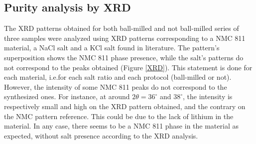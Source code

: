 \documentclass{article}
\begin{document}
\subsection{Purity analysis by XRD}
The XRD patterns obtained for both ball-milled and not ball-milled series of three samples were 
analyzed using XRD patterns corresponding to a NMC 811 material, a NaCl salt and a KCl salt found in
 literature. The pattern's superposition shows the NMC 811 phase presence, while the salt's patterns
 do not correspond to the peaks obtained (Figure \ref{XRD}). This statement is done for each material, i.e.for
 each salt ratio and each protocol (ball-milled or not). However, the intensity of some NMC 811 peaks do 
not correspond to the synthesized ones. For instance, at around \(2\theta=36^\circ\) and \(38^\circ\), the intensity is respectively
 small and high on the XRD pattern obtained, and the contrary on the NMC pattern reference. This could be due
 to the lack of lithium in the material. In any case, there seems to be a NMC
 811 phase in the material as expected, without salt presence according to the XRD analysis.\cite{mambo}\cite{tango}\\
\end{document}

